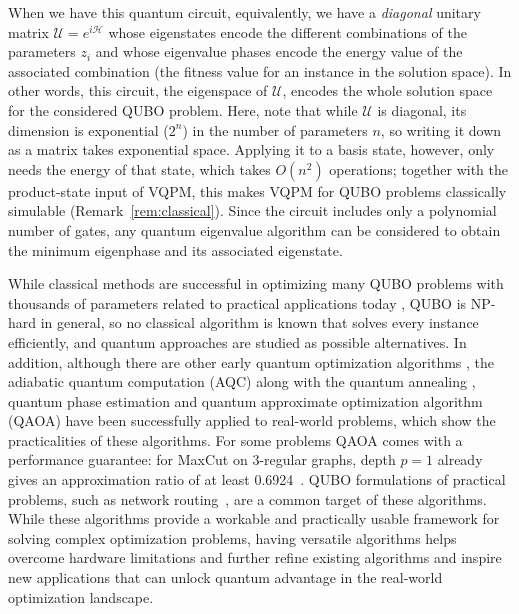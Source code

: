\documentclass[onecolumn,10pt]{article}
\theoremstyle{remark}
\theoremstyle{plain}
\begin{document}
When we have this quantum circuit, equivalently, we have a \emph{diagonal} unitary matrix $\mathcal{U} = e^{i\mathcal{H}}$ whose eigenstates encode the different combinations of the parameters $z_i$ and whose eigenvalue phases encode the energy value of the associated combination (the fitness value for an instance in the solution space).  
In other words, this circuit, the eigenspace of $\mathcal{U}$, encodes the whole solution space for the considered QUBO problem.  
Here, note that while $\mathcal{U}$ is diagonal, its dimension is exponential ($2^n$) in the number of parameters $n$, so writing it down as a matrix takes exponential space. Applying it to a basis state, however, only needs the energy of that state, which takes $O(n^2)$ operations; together with the product-state input of VQPM, this makes VQPM for QUBO problems classically simulable (Remark~\ref{rem:classical}).
Since the circuit includes only a polynomial number of gates, any quantum eigenvalue algorithm can be considered to obtain the minimum eigenphase and its associated eigenstate.

While classical methods are successful in optimizing many QUBO problems with thousands of parameters related to practical applications today \cite{anand2017comparative}, QUBO is NP-hard in general, so no classical algorithm is known that solves every instance efficiently, and quantum approaches are studied as possible alternatives. In addition, although there are other early quantum optimization algorithms \cite{hogg2000quantum}, the adiabatic quantum computation (AQC) \cite{farhi2000quantum,van2001powerful,aharonov2008adiabatic} along with the quantum annealing \cite{finnila1994quantum}, quantum phase estimation \cite{kitaev1995quantum} and quantum approximate optimization algorithm (QAOA) \cite{farhi2014quantum} have been successfully applied to real-world problems, which show the practicalities of these algorithms. For some problems QAOA comes with a performance guarantee: for MaxCut on 3-regular graphs, depth $p=1$ already gives an approximation ratio of at least 0.6924~\cite{farhi2014quantum}. QUBO formulations of practical problems, such as network routing~\cite{silva2022qubo}, are a common target of these algorithms.  
While these algorithms provide a workable and practically usable framework for solving complex optimization problems, having versatile algorithms helps overcome hardware limitations and further refine existing algorithms and inspire new applications that can unlock quantum advantage in the real-world optimization landscape.
\end{document}
